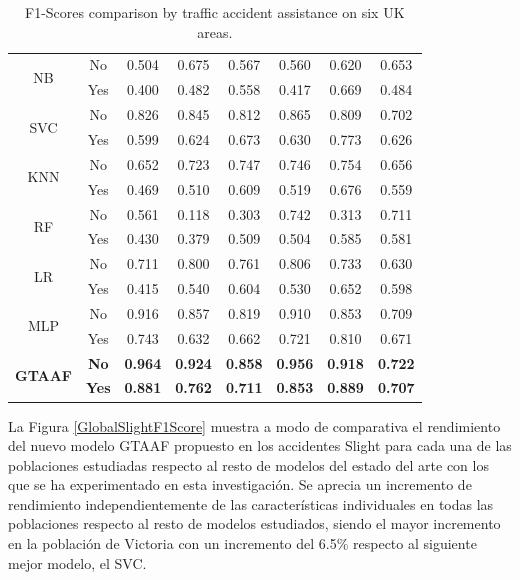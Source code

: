 \documentclass{uathesis-es}
\begin{document}
{\begin{table}[H]
\begin{center}
\begin{tabular}{|c|c||c|c|c|c|c|c|}
        \multirow{2}{*}{NB} &
            No & 0.504 & 0.675 &  0.567 & 0.560 & 0.620 & 0.653 \\ &
		    Yes & 0.400 & 0.482 & 0.558 & 0.417 & 0.669 & 0.484 \\ \hline \hline
        \multirow{2}{*}{SVC} &
            No & 0.826 & 0.845 & 0.812 & 0.865 & 0.809 & 0.702 \\ &
		    Yes & 0.599 & 0.624 & 0.673 & 0.630 & 0.773 & 0.626 \\ \hline \hline
        \multirow{2}{*}{KNN} &
            No  & 0.652 & 0.723 & 0.747 & 0.746 & 0.754 & 0.656 \\ &
            Yes & 0.469 & 0.510 & 0.609 & 0.519 & 0.676 & 0.559 \\ \hline \hline
        \multirow{2}{*}{RF} &
            No & 0.561  & 0.118 & 0.303 & 0.742 & 0.313 & 0.711 \\ &
            Yes & 0.430 & 0.379 & 0.509 & 0.504 & 0.585 & 0.581 \\ \hline \hline
        \multirow{2}{*}{LR} &
            No & 0.711 & 0.800 & 0.761 & 0.806 & 0.733 & 0.630 \\ &
            Yes & 0.415 & 0.540 & 0.604 & 0.530 & 0.652 & 0.598 \\ \hline \hline
        \multirow{2}{*}{MLP} &
            No & 0.916 &  0.857 & 0.819 & 0.910 & 0.853 & 0.709 \\ &
            Yes & 0.743 & 0.632 & 0.662 & 0.721 & 0.810 & 0.671 \\ \hline \hline
        \multirow{2}{*}{\textbf     {GTAAF}} &
            \textbf{No} & \textbf{0.964} & \textbf{0.924} & \textbf{0.858} & \textbf{0.956} & \textbf{0.918} & \textbf{0.722} \\ &
            \textbf{Yes} & \textbf{0.881} & \textbf{0.762} & \textbf{0.711} & \textbf{0.853} & \textbf{0.889} & \textbf{0.707} \\ \hline \hline
		\end{tabular}
	\end{center}
	\caption{F1-Scores comparison by traffic accident assistance on six UK areas.}
	\label{UKMetrics}
\end{table}


La Figura \ref{GlobalSlightF1Score} muestra a modo de comparativa el rendimiento del nuevo modelo GTAAF propuesto en los accidentes Slight para cada una de las poblaciones estudiadas respecto al resto de modelos del estado del arte con los que se ha experimentado en esta investigación. Se aprecia un incremento de rendimiento independientemente de las características individuales en todas las poblaciones respecto al resto de modelos estudiados, siendo el mayor incremento en la población de Victoria con un incremento del 6.5\% respecto al siguiente mejor modelo, el SVC.

}
\end{document}
